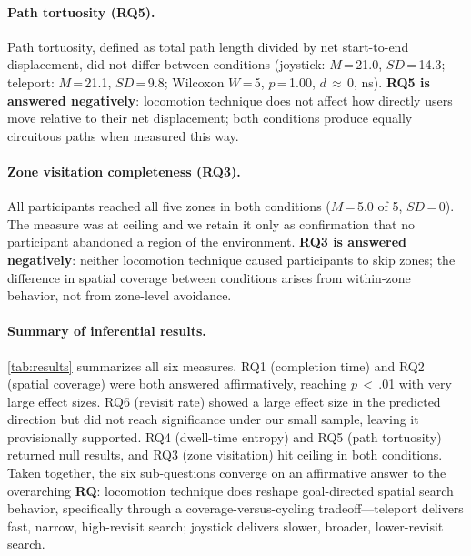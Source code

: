 \documentclass{vgtc}
\begin{document}
\paragraph{Path tortuosity (RQ5).}
Path tortuosity, defined as total path length divided by net start-to-end displacement, did not differ between conditions (joystick: $M$\,=\,21.0, $SD$\,=\,14.3; teleport: $M$\,=\,21.1, $SD$\,=\,9.8; Wilcoxon $W$\,=\,5, $p$\,=\,1.00, $d$\,$\approx$\,0, ns). \textbf{RQ5 is answered negatively}: locomotion technique does not affect how directly users move relative to their net displacement; both conditions produce equally circuitous paths when measured this way.

\paragraph{Zone visitation completeness (RQ3).}
All participants reached all five zones in both conditions ($M$\,=\,5.0 of 5, $SD$\,=\,0). The measure was at ceiling and we retain it only as confirmation that no participant abandoned a region of the environment. \textbf{RQ3 is answered negatively}: neither locomotion technique caused participants to skip zones; the difference in spatial coverage between conditions arises from within-zone behavior, not from zone-level avoidance.

\paragraph{Summary of inferential results.}
\autoref{tab:results} summarizes all six measures. RQ1 (completion time) and RQ2 (spatial coverage) were both answered affirmatively, reaching $p$\,$<$\,.01 with very large effect sizes. RQ6 (revisit rate) showed a large effect size in the predicted direction but did not reach significance under our small sample, leaving it provisionally supported. RQ4 (dwell-time entropy) and RQ5 (path tortuosity) returned null results, and RQ3 (zone visitation) hit ceiling in both conditions. Taken together, the six sub-questions converge on an affirmative answer to the overarching \textbf{RQ}: locomotion technique does reshape goal-directed spatial search behavior, specifically through a coverage-versus-cycling tradeoff---teleport delivers fast, narrow, high-revisit search; joystick delivers slower, broader, lower-revisit search.
\end{document}
